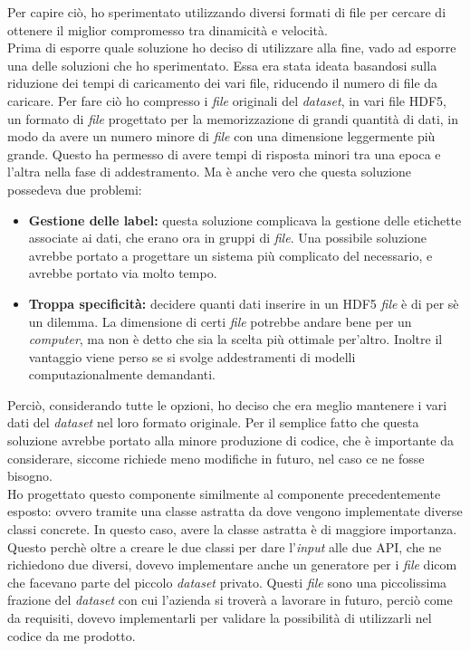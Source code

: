 Per capire ciò, ho sperimentato utilizzando diversi formati di file per cercare di ottenere il miglior compromesso tra dinamicità e velocità.\\
Prima di esporre quale soluzione ho deciso di utilizzare alla fine, vado ad esporre una delle soluzioni che ho sperimentato.
Essa era stata ideata basandosi sulla riduzione dei tempi di caricamento dei vari file, riducendo il numero di file da caricare.
Per fare ciò ho compresso i \textit{file} originali del \textit{dataset}, in vari file HDF5, un formato di \textit{file} progettato per la memorizzazione di grandi quantità di dati, in modo da avere un numero minore di \textit{file} con una dimensione leggermente più grande.
Questo ha permesso di avere tempi di risposta minori tra una epoca e l'altra nella fase di addestramento.
Ma è anche vero che questa soluzione possedeva due problemi:
\begin{itemize}
    \item \textbf{Gestione delle \gls{label}:} questa soluzione complicava la gestione delle etichette associate ai dati, che erano ora in gruppi di \textit{file}. Una possibile soluzione avrebbe portato a progettare un sistema più complicato del necessario, e avrebbe portato via molto tempo.
    \item \textbf{Troppa specificità:} decidere quanti dati inserire in un HDF5 \textit{file} è di per sè un dilemma. La dimensione di certi \textit{file} potrebbe andare bene per un \textit{computer}, ma non è detto che sia la scelta più ottimale per'altro. Inoltre il vantaggio viene perso se si svolge addestramenti di modelli computazionalmente demandanti.
\end{itemize}
Perciò, considerando tutte le opzioni, ho deciso che era meglio mantenere i vari dati del \textit{dataset} nel loro formato originale. Per il semplice fatto che questa soluzione avrebbe portato alla minore produzione di codice, che è importante da considerare, siccome richiede meno modifiche in futuro, nel caso ce ne fosse bisogno.\\
Ho progettato questo componente similmente al componente precedentemente esposto: ovvero tramite una classe astratta da dove vengono implementate diverse classi concrete.
In questo caso, avere la classe astratta è di maggiore importanza. Questo perchè oltre a creare le due classi per dare l'\textit{input} alle due API, che ne richiedono due diversi, dovevo implementare anche un generatore per i \textit{file} \gls{dicom} che facevano parte del piccolo \textit{dataset} privato.
Questi \textit{file} sono una piccolissima frazione del \textit{dataset} con cui l'azienda si troverà a lavorare in futuro, perciò come da requisiti, dovevo implementarli per validare la possibilità di utilizzarli nel codice da me prodotto.
